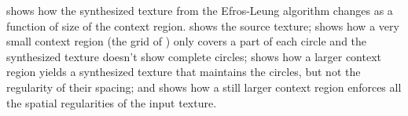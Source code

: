 {%




\Fig{\ref{fig:efros1}} shows how the synthesized texture from the Efros-Leung algorithm \cite{Efros99} changes as a function of size of the context region.  shows the source texture;  shows how a very small context region (the grid of \fig{\ref{fig:sampling_efros_leung}}) only covers a part of each circle and the synthesized texture doesn't show complete circles;  shows how a larger context region yields a synthesized texture that maintains the circles, but not the regularity of their spacing; and  shows how a still larger context region enforces all the spatial regularities of the input texture.


}
